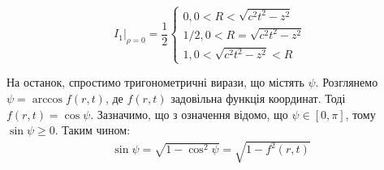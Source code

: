 %
%
\begin{equation}
\left. I_1 \right|_{\rho = 0} = \frac{1}{2} \begin{cases}
0, 0 < R < \sqrt{c^2t^2 - z^2} \\
1/2, 0 < R = \sqrt{c^2t^2 - z^2} \\ 
1, 0 < \sqrt{c^2t^2 - z^2} < R 
\end{cases}
\end{equation}

На останок, спростимо тригонометричні вирази, що містять $ \psi $. Розглянемо 
$ \psi = \arccos f(r,t) $, де $ f(r,t) $ задовільна функція координат. 
Тоді $ f(r,t) = \cos \psi $. Зазначимо, що з означення відомо, що 
$ \psi \in \left[ 0, \pi \right] $, тому $ \sin \psi \geq 0 $. Таким чином:
%
\begin{equation*} \begin{aligned}
\sin \psi = \sqrt{1 - \cos^2 \psi } = \sqrt{1 - f^2(r,t)}
\end{aligned} \end{equation*}

